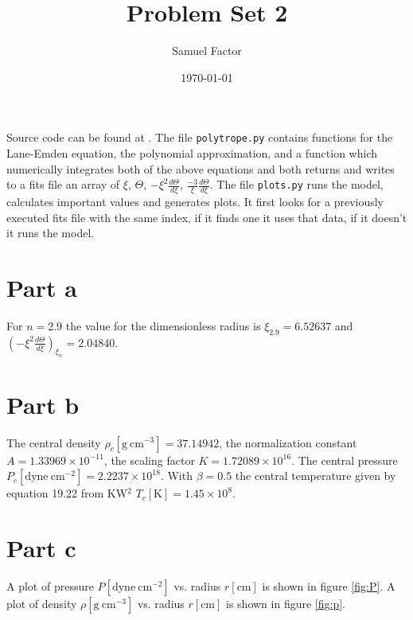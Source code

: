 \documentclass[12pt]{article}
\title{Problem Set 2}
\author{Samuel Factor}
\date{\today}                                           %
\begin{document}
\maketitle

Source code can be found at \url{}. The file \texttt{polytrope.py} contains functions for the Lane-Emden equation, the polynomial approximation, and a function which numerically integrates both of the above equations and both returns and writes to a fits file an array of $\xi$, $\Theta$, $-\xi^2 \frac{d\Theta}{d\xi}$, $\frac{-3}{\xi}\frac{d\Theta}{d\xi}$. The file \texttt{plots.py} runs the model, calculates important values and generates plots. It first looks for a previously executed fits file with the same index, if it finds one it uses that data, if it doesn't it runs the model. 

\section{Part a}
For $n=2.9$ the value for the dimensionless radius is $\xi_{2.9}=6.52637$ and $(-\xi^2\frac{d\Theta}{d\xi})_{\xi_n}=2.04840$.

\section{Part b}
The central density $\rho_c [\mathrm{g~cm^{-3}}] =37.14942$, the normalization constant $A=1.33969\times10^{-11}$, the scaling factor $K=1.72089\times10^{16}$. The central pressure $P_c [\mathrm{dyne~cm^{-2}}] = 2.2237\times10^{18}$. With $\beta=0.5$ the central temperature given by equation 19.22 from KW$^2$ $T_c[\mathrm{K}]=1.45\times10^8$.

\section{Part c}
A plot of pressure $P [\mathrm{dyne~cm^{-2}}]$ vs. radius $r [\mathrm{cm}]$ is shown in figure \ref{fig:P}. A plot of density $\rho [\mathrm{g~cm^{-3}}]$ vs. radius $r [\mathrm{cm}]$ is shown in figure \ref{fig:p}.
\end{document}
